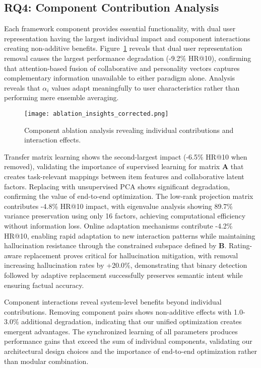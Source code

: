 \documentclass[acmsmall]{acmart}
\begin{document}
\subsection{RQ4: Component Contribution Analysis}

Each framework component provides essential functionality, with dual user representation having the largest individual impact and component interactions creating non-additive benefits. Figure~\ref{fig:rq4_analysis} reveals that dual user representation removal causes the largest performance degradation (-9.2\% HR@10), confirming that attention-based fusion of collaborative and personality vectors captures complementary information unavailable to either paradigm alone. Analysis reveals that $\alpha_i$ values adapt meaningfully to user characteristics rather than performing mere ensemble averaging.

\begin{figure}[h]
\centering
\texttt{[image: ablation\_insights\_corrected.png]}
\caption{Component ablation analysis revealing individual contributions and interaction effects.}
\label{fig:rq4_analysis}
\end{figure}

Transfer matrix learning shows the second-largest impact (-6.5\% HR@10 when removed), validating the importance of supervised learning for matrix $\mathbf{A}$ that creates task-relevant mappings between item features and collaborative latent factors. Replacing with unsupervised PCA shows significant degradation, confirming the value of end-to-end optimization. The low-rank projection matrix contributes -4.8\% HR@10 impact, with eigenvalue analysis showing 89.7\% variance preservation using only 16 factors, achieving computational efficiency without information loss. Online adaptation mechanisms contribute -4.2\% HR@10, enabling rapid adaptation to new interaction patterns while maintaining hallucination resistance through the constrained subspace defined by $\mathbf{B}$. Rating-aware replacement proves critical for hallucination mitigation, with removal increasing hallucination rates by +20.0\%, demonstrating that binary detection followed by adaptive replacement successfully preserves semantic intent while ensuring factual accuracy.

Component interactions reveal system-level benefits beyond individual contributions. Removing component pairs shows non-additive effects with 1.0-3.0\% additional degradation, indicating that our unified optimization creates emergent advantages. The synchronized learning of all parameters produces performance gains that exceed the sum of individual components, validating our architectural design choices and the importance of end-to-end optimization rather than modular combination.
\end{document}
